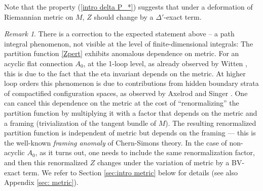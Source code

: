 \documentclass[11pt,a4paper]{amsart}
\theoremstyle{plain} %
\theoremstyle{definition}
\theoremstyle{remark}
\newtheorem{rem}[thm]{Remark}
\newcommand{\mr}{\mathrm}
\begin{document}
Note that the property (\ref{intro delta P_*}) suggests that under a deformation of Riemannian metric on $M$, $Z$ should change by a $\Delta'$-exact term.

\begin{rem}%
\label{rem: def Z pert framing}
There is a correction to the expected statement above 
-- a path integral phenomenon, not visible at the level of finite-dimensional integrals: The partition function \eqref{Zpert} exhibits anomalous dependence on metric. For an acyclic flat connection $A_0$, 
         at the 1-loop level, as already observed by Witten \cite{Witten1989}, this is due to the fact that the eta invariant depends on the metric. At higher loop orders this phenomenon is due to contributions from hidden boundary strata of %
         compactified configuration spaces, 
         as observed by Axelrod and Singer \cite{Axelrod1991}. One can cancel this dependence on the metric at the cost of ``renormalizing'' the partition function by multiplying it with a factor that depends on the metric and a framing (trivialization of the tangent bundle of $M$). The resulting renormalized partition function is independent of metric but depends on the framing
         --- this is the well-known \emph{framing anomaly} of Chern-Simons theory.
         In the case of non-acyclic $A_0$, as it turns out, one needs to include the same renormalization factor, and then this renormalized $Z$ changes under the variation of metric by a BV-exact term.
          We refer to
          Section \ref{sec:intro metric} below for details (see also Appendix \ref{sec: metric}). 
         \end{rem}
\end{document}
